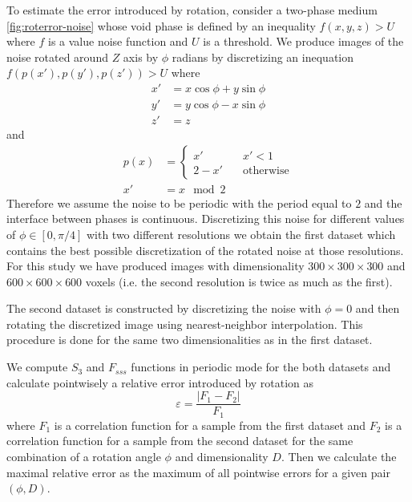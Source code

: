\documentclass[reprint,amsmath,amssymb,aps,pre,showkeys,showpacs]{revtex4-1}
\begin{document}
To estimate the error introduced by rotation, consider a two-phase medium
\cref{fig:roterror-noise} whose void phase is defined by an inequality
$f(x, y, z) > U$ where $f$ is a value noise function and $U$ is a threshold. We
produce images of the noise rotated around $Z$ axis by $\phi$ radians by
discretizing an inequation $f(p(x'), p(y'), p(z')) > U$ where
\begin{equation*}
  \begin{aligned}
    x' &= x \cos \phi + y \sin \phi \\
    y' &= y \cos \phi - x \sin \phi \\
    z' &= z
  \end{aligned}
\end{equation*}
and
\begin{equation*}
  \begin{aligned}
    p(x) &= \left\{
    \begin{array}{ll}
      x'     & \quad x' < 1 \\
      2 - x' & \quad \text{otherwise}
    \end{array}
    \right. \\
    x ' &= x \mod 2
  \end{aligned}
\end{equation*}
Therefore we assume the noise to be periodic with the period equal to $2$ and
the interface between phases is continuous. Discretizing this noise for
different values of $\phi \in [0, \pi/4]$ with two different resolutions we
obtain the first dataset which contains the best possible discretization of the
rotated noise at those resolutions. For this study we have produced images with
dimensionality $300 \times 300 \times 300$ and $600 \times 600 \times 600$
voxels (i.e. the second resolution is twice as much as the first).

The second dataset is constructed by discretizing the noise with $\phi = 0$ and
then rotating the discretized image using nearest-neighbor interpolation. This
procedure is done for the same two dimensionalities as in the first dataset.

We compute $S_3$ and $F_{sss}$ functions in periodic mode for the both datasets
and calculate pointwisely a relative error introduced by rotation as
\begin{equation}
  \varepsilon = \frac{|F_1 - F_2|}{F_1}
  \label{eq:relerr}
\end{equation}
where $F_1$ is a correlation function for a sample from the first dataset and
$F_2$ is a correlation function for a sample from the second dataset for the
same combination of a rotation angle $\phi$ and dimensionality $D$. Then we
calculate the maximal relative error as the maximum of all pointwise errors for
a given pair $(\phi, D)$.
\end{document}
